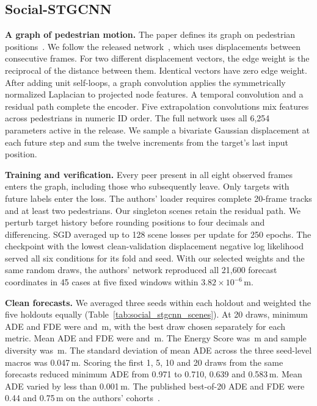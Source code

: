 \subsection{Social-STGCNN}
\label{sec:social_stgcnn}

\textbf{A graph of pedestrian motion.}
The paper defines its graph on pedestrian positions~\cite{mohamed2020socialstgcnn}.
We follow the released network~\cite{mohamedstgcnncode}, which uses
displacements between consecutive frames. For two different displacement
vectors, the edge weight is the reciprocal of the distance between them.
Identical vectors have zero edge weight. After adding unit self-loops, a graph
convolution applies the symmetrically normalized Laplacian to projected node
features. A temporal convolution and a residual path complete the encoder.
Five extrapolation convolutions mix features across pedestrians in numeric ID
order. The full network uses all 6,254 parameters active in the release.
We sample a bivariate Gaussian displacement at each
future step and sum the twelve increments from the target's last input position.

\textbf{Training and verification.}
Every peer present in all eight observed frames enters the graph, including
those who subsequently leave. Only targets with future labels enter the loss.
The authors' loader requires complete 20-frame tracks and at least two
pedestrians. Our singleton scenes retain the residual path. We perturb target
history before rounding positions to four decimals and differencing. SGD
averaged up to 128 scene losses per update for 250 epochs. The checkpoint with
the lowest clean-validation displacement negative log likelihood served all
six conditions for its fold and seed. With our selected weights and the same
random draws, the authors' network reproduced all 21,600 forecast coordinates
in 45 cases at five fixed windows within $3.82\times10^{-6}$\,m.

\textbf{Clean forecasts.}
We averaged three seeds within each holdout and weighted the five holdouts
equally (Table~\ref{tab:social_stgcnn_scenes}). At 20 draws, minimum ADE and
FDE were  and
\,m, with the best draw
chosen separately for each metric. Mean ADE and FDE were
 and
\,m. The Energy Score was
\,m and sample diversity was
\,m. The standard
deviation of mean ADE across the three seed-level macros was 0.047\,m.
Scoring the first 1, 5, 10 and 20 draws from the same forecasts reduced minimum
ADE from 0.971 to 0.710, 0.639 and 0.583\,m. Mean ADE varied by less than
0.001\,m. The published best-of-20 ADE and FDE were 0.44 and 0.75\,m
on the authors' cohorts~\cite{mohamed2020socialstgcnn}.

